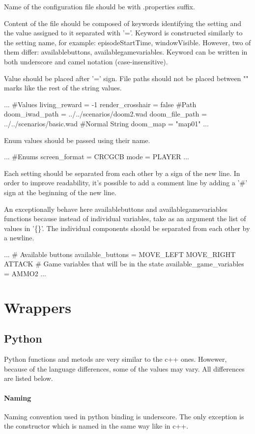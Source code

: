 Name of the configuration file should be with .properties suffix.

Content of the file should be composed of keywords identifying the setting and the value assigned to it separated with '='. Keyword is constructed similarly to the setting name, for example: episodeStartTime, windowVisible. However, two of them differ: availablebuttons, availablegamevariables.
Keyword can be written in both underscore and camel notation (case-insensitive). 


Value should be placed after '=' sign. File paths should not be placed between "" marks like the rest of the string values.
\begin{pblock}
...
#Values
living_reward = -1
render_crosshair = false
#Path
doom_iwad_path = ../../scenarios/doom2.wad
doom_file_path = ../../scenarios/basic.wad
#Normal String
doom_map = "map01"
...
\end{pblock}
Enum values should be passed using their name.
\begin{pblock}
...
#Enums
screen_format = CRCGCB
mode = PLAYER
...
\end{pblock}
Each setting should be separated from each other by a sign of the new line. In order to improve readability, it's possible to add a comment line by adding a '\#' sign at the beginning of the new line.

An exceptionally behave here availablebuttons and availablegamevariables functions because instead of individual variables, take as an argument the list of values in '\{\}'. The individual components should be separated from each other by a newline.
\begin{pblock}
...
# Available buttons
available_buttons = 
	{ 
		MOVE_LEFT 
		MOVE_RIGHT 
		ATTACK 
	}
# Game variables that will be in the state
available_game_variables = { AMMO2}
...
\end{pblock}

\section{Wrappers}
\subsection{Python}

Python functions and metods are very similar to the c++ ones. Howewer, because of the language differences, some of the values may vary. All differences are listed below.

\paragraph {Naming}
Naming convention used in python binding is underscore. The only exception is the constructor which is named in the same way like in c++.

